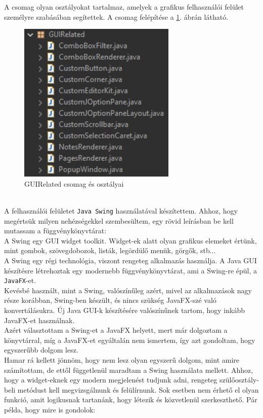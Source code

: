 A csomag olyan osztályokat tartalmaz, amelyek a grafikus felhasználói felület személyre szabásában segítettek. A csomag felépítése a \ref{fig:package_guirelated}. ábrán látható.
\begin{figure}[h]
	\centering
	\includegraphics[scale=0.6]{images/package_guirelated.png}
	\caption{GUIRelated csomag és osztályai}
	\label{fig:package_guirelated}
\end{figure}
\\A felhasználói felületet \texttt{Java Swing} használatával készítettem. Ahhoz, hogy megértsük milyen nehézségekkel szembesültem, egy rövid leírásban be kell mutassam a függvénykönyvtárat:
\vspace{10pt}\\A Swing egy GUI widget toolkit. Widget-ek alatt olyan grafikus elemeket értünk, mint gombok, szövegdobozok, listák, legördülő menük, görgők, stb...
\\A Swing egy régi technológia, viszont rengeteg alkalmazás használja. A Java GUI készítésre létrehoztak egy modernebb függvénykönyvtárat, ami a Swing-re épül, a \texttt{JavaFX}-et.
\\Kevésbé használt, mint a Swing, valószínűleg azért, mivel az alkalmazások nagy része korábban, Swing-ben készült, és nincs szükség JavaFX-szé való konvertálásukra. Új Java GUI-k készítésére valószínűnek tartom, hogy inkább JavaFX-et használnak.
\vspace{10pt}\\Azért választottam a Swing-et a JavaFX helyett, mert már dolgoztam a könyvtárral, míg a JavaFX-et egyáltalán nem ismertem, így azt gondoltam, hogy egyszerűbb dolgom lesz.
\\Hamar rá kellett jönnöm, hogy nem lesz olyan egyszerű dolgom, mint amire számítottam, de ettől függetlenül maradtam a Swing használata mellett. Ahhoz, hogy a widget-eknek egy modern megjelenést tudjunk adni, rengeteg szülőosztály-beli metódust kell megvizsgálnunk és felülírnunk. Sok esetben nem érhető el olyan funkció, amit logikusnak tartanánk, hogy létezik és közvetlenül szerkeszthető. Pár példa, hogy mire is gondolok:
